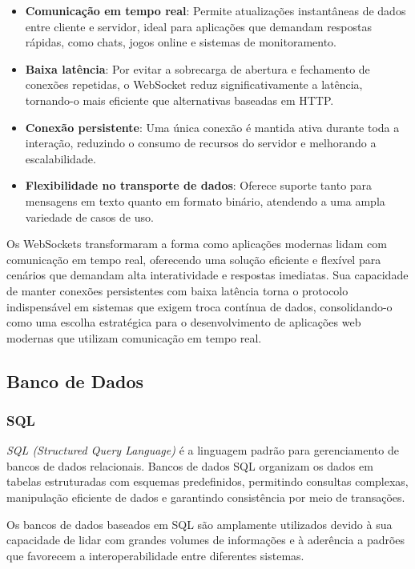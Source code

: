 \begin{itemize}
    \item \textbf{Comunicação em tempo real}: Permite atualizações instantâneas de dados entre cliente e servidor, ideal para aplicações que demandam respostas rápidas, como chats, jogos online e sistemas de monitoramento.
    \item \textbf{Baixa latência}: Por evitar a sobrecarga de abertura e fechamento de conexões repetidas, o WebSocket reduz significativamente a latência, tornando-o mais eficiente que alternativas baseadas em HTTP.
    \item \textbf{Conexão persistente}: Uma única conexão é mantida ativa durante toda a interação, reduzindo o consumo de recursos do servidor e melhorando a escalabilidade.
    \item \textbf{Flexibilidade no transporte de dados}: Oferece suporte tanto para mensagens em texto quanto em formato binário, atendendo a uma ampla variedade de casos de uso.
\end{itemize}

Os WebSockets transformaram a forma como aplicações modernas lidam com comunicação em tempo real, oferecendo uma solução eficiente e flexível para cenários que demandam alta interatividade e respostas imediatas. Sua capacidade de manter conexões persistentes com baixa latência torna o protocolo indispensável em sistemas que exigem troca contínua de dados, consolidando-o como uma escolha estratégica para o desenvolvimento de aplicações web modernas que utilizam comunicação em tempo real\cite{murley2021websocket}.

\subsection{Banco de Dados}


\subsubsection{SQL}

\emph{SQL (Structured Query Language)} é a linguagem padrão para gerenciamento de bancos de dados relacionais\cite{sql-wiki}. Bancos de dados SQL organizam os dados em tabelas estruturadas com esquemas predefinidos, permitindo consultas complexas, manipulação eficiente de dados e garantindo consistência por meio de transações.

Os bancos de dados baseados em SQL são amplamente utilizados devido à sua capacidade de lidar com grandes volumes de informações e à aderência a padrões que favorecem a interoperabilidade entre diferentes sistemas.

